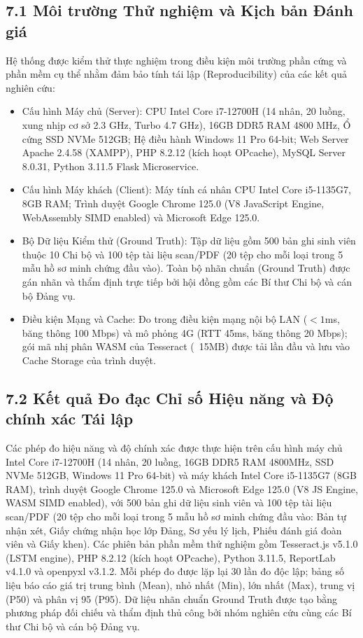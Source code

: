 \documentclass[12pt,a4paper]{report}
\begin{document}
\subsection*{7.1 Môi trường Thử nghiệm và Kịch bản Đánh giá}
Hệ thống được kiểm thử thực nghiệm trong điều kiện môi trường phần cứng và phần mềm cụ thể nhằm đảm bảo tính tái lập (Reproducibility) của các kết quả nghiên cứu:
\begin{itemize}[label=--,leftmargin=*]
  \item Cấu hình Máy chủ (Server): CPU Intel Core i7-12700H (14 nhân, 20 luồng, xung nhịp cơ sở 2.3 GHz, Turbo 4.7 GHz), 16GB DDR5 RAM 4800 MHz, Ổ cứng SSD NVMe 512GB; Hệ điều hành Windows 11 Pro 64-bit; Web Server Apache 2.4.58 (XAMPP), PHP 8.2.12 (kích hoạt OPcache), MySQL Server 8.0.31, Python 3.11.5 Flask Microservice.
  \item Cấu hình Máy khách (Client): Máy tính cá nhân CPU Intel Core i5-1135G7, 8GB RAM; Trình duyệt Google Chrome 125.0 (V8 JavaScript Engine, WebAssembly SIMD enabled) và Microsoft Edge 125.0.
  \item Bộ Dữ liệu Kiểm thử (Ground Truth): Tập dữ liệu gồm 500 bản ghi sinh viên thuộc 10 Chi bộ và 100 tệp tài liệu scan/PDF (20 tệp cho mỗi loại trong 5 mẫu hồ sơ minh chứng đầu vào). Toàn bộ nhãn chuẩn (Ground Truth) được gán nhãn và thẩm định trực tiếp bởi hội đồng gồm các Bí thư Chi bộ và cán bộ Đảng vụ.
  \item Điều kiện Mạng và Cache: Đo trong điều kiện mạng nội bộ LAN ($< 1$ms, băng thông 100 Mbps) và mô phỏng 4G (RTT 45ms, băng thông 20 Mbps); gói mã nhị phân WASM của Tesseract (~15MB) được tải lần đầu và lưu vào Cache Storage của trình duyệt.
\end{itemize}

\subsection*{7.2 Kết quả Đo đạc Chỉ số Hiệu năng và Độ chính xác Tái lập}
Các phép đo hiệu năng và độ chính xác được thực hiện trên cấu hình máy chủ Intel Core i7-12700H (14 nhân, 20 luồng, 16GB DDR5 RAM 4800MHz, SSD NVMe 512GB, Windows 11 Pro 64-bit) và máy khách Intel Core i5-1135G7 (8GB RAM), trình duyệt Google Chrome 125.0 và Microsoft Edge 125.0 (V8 JS Engine, WASM SIMD enabled), với 500 bản ghi dữ liệu sinh viên và 100 tệp tài liệu scan/PDF (20 tệp cho mỗi loại trong 5 mẫu hồ sơ minh chứng đầu vào: Bản tự nhận xét, Giấy chứng nhận học lớp Đảng, Sơ yếu lý lịch, Phiếu đánh giá đoàn viên và Giấy khen). Các phiên bản phần mềm thử nghiệm gồm Tesseract.js v5.1.0 (LSTM engine), PHP 8.2.12 (kích hoạt OPcache), Python 3.11.5, ReportLab v4.1.0 và openpyxl v3.1.2. Mỗi phép đo được lặp lại 30 lần đo độc lập; bảng số liệu báo cáo giá trị trung bình (Mean), nhỏ nhất (Min), lớn nhất (Max), trung vị (P50) và phân vị 95 (P95). Dữ liệu nhãn chuẩn Ground Truth được tạo bằng phương pháp đối chiếu và thẩm định thủ công bởi nhóm nghiên cứu cùng các Bí thư Chi bộ và cán bộ Đảng vụ.
\end{document}
